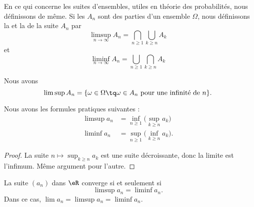 \begin{normaltext}      \label{ooEEQJooRMFzVR}
	En ce qui concerne les suites d'ensembles, utiles en théorie des probabilités, nous définissons de même. Si les \( A_n\) sont des parties d'un ensemble \( \Omega\), nous définissons la  et la  de la suite \( A_n\) par
	\begin{equation}
		\limsup_{n\to\infty}A_n=\bigcap_{n\geq 1}\bigcup_{k\geq n}A_k
	\end{equation}
	et
	\begin{equation}
		\liminf_{n\to\infty}A_n=\bigcup_{n\geq 1}\bigcap_{k\geq n}A_k
	\end{equation}

	Nous avons
	\begin{equation}
		\limsup A_n=\{ \omega\in\Omega\tq \omega\in A_n\text{ pour une infinité de } n \}.
	\end{equation}
\end{normaltext}

\begin{lemma}     \label{ooAQTEooYDBovS}
	Nous avons les formules pratiques suivantes :
	\begin{subequations}
		\begin{align}
			\limsup a_n & =\inf_{n\geq 1}\big( \sup_{k\geq n}a_k \big)  \\
			\liminf a_n & =\sup_{n\geq 1}\big( \inf_{k\geq n}a_k \big).
		\end{align}
	\end{subequations}
\end{lemma}

\begin{proof}
	La suite \( n\mapsto \sup_{k\geq n}a_k\) est une suite décroissante, donc la limite est l'infimum. Même argument pour l'autre.
\end{proof}

\begin{lemma}       \label{ooIQIKooXWwAmM}
	La suite \( (a_n)\) dans \( \eR\) converge si et seulement si
	\begin{equation}
		\limsup a_n=\liminf a_n.
	\end{equation}
	Dans ce cas, \( \lim a_n=\limsup a_n=\liminf a_n\).
\end{lemma}

